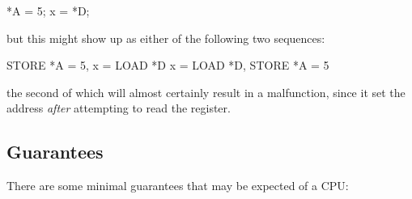 \begin{VerbatimU}
	*A = 5;
	x = *D;
\end{VerbatimU}

but this might show up as either of the following two sequences:

\begin{VerbatimU}
	STORE *A = 5, x = LOAD *D
	x = LOAD *D, STORE *A = 5
\end{VerbatimU}

the second of which will almost certainly result in a malfunction, since it set
the address \emph{after} attempting to read the register.


\subsection{Guarantees}

There are some minimal guarantees that may be expected of a CPU:

